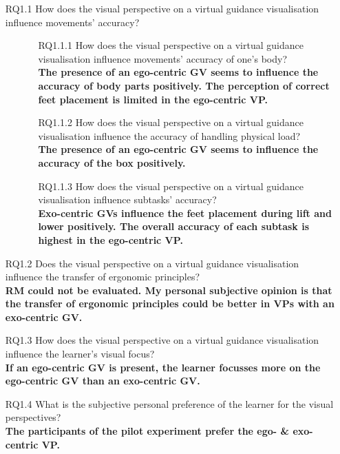 \begin{enumerate}[align=left, leftmargin=0pt, labelindent=\parindent,
	listparindent=\parindent, labelwidth=0pt, itemindent=!]
	\item[RQ1.1] How does the visual perspective on a virtual guidance visualisation influence movements' accuracy?
	\begin{itemize}
		\item[] \begin{itemize}
			\item[RQ1.1.1] How does the visual perspective on a virtual guidance visualisation influence movements' accuracy of one's body?\\
			\textbf{The presence of an ego-centric GV seems to influence the accuracy of body parts positively. The perception of correct feet placement is limited in the ego-centric VP.}
			\item[RQ1.1.2] How does the visual perspective on a virtual guidance visualisation influence the accuracy of handling physical load?\\
			\textbf{The presence of an ego-centric GV seems to influence the accuracy of the box positively.}
			\item[RQ1.1.3] How does the visual perspective on a virtual guidance visualisation influence subtasks' accuracy?\\
			\textbf{Exo-centric GVs influence the feet placement during lift and lower positively. The overall accuracy of each subtask is highest in the ego-centric VP.}
		\end{itemize}
	\end{itemize}
	
	\item[RQ1.2] Does the visual perspective on a virtual guidance visualisation influence the transfer of ergonomic principles?\\
	\textbf{RM could not be evaluated. My personal subjective opinion is that the transfer of ergonomic principles could be better in VPs with an exo-centric GV.}
	\item[RQ1.3] How does the visual perspective on a virtual guidance visualisation influence the learner's visual focus?\\
	\textbf{If an ego-centric GV is present, the learner focusses more on the ego-centric GV than an exo-centric GV.}
	\item[RQ1.4] What is the subjective personal preference of the learner for the visual perspectives?\\
	\textbf{The participants of the pilot experiment prefer the ego- \& exo-centric VP.}
\end{enumerate}

